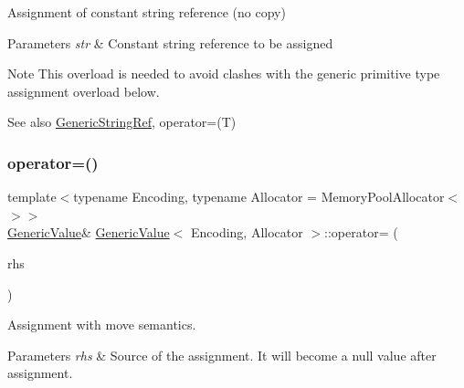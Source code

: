 Assignment of constant string reference (no copy) 


\begin{DoxyParams}{Parameters}
{\em str} & Constant string reference to be assigned \\
\hline
\end{DoxyParams}
\begin{DoxyNote}{Note}
This overload is needed to avoid clashes with the generic primitive type assignment overload below. 
\end{DoxyNote}
\begin{DoxySeeAlso}{See also}
\hyperlink{structGenericStringRef}{Generic\+String\+Ref}, operator=(\+T) 
\end{DoxySeeAlso}
\mbox{\label{classGenericValue_a9018a40d7c52efc00daf803c51d3236c}} 
\subsubsection{\texorpdfstring{operator=()}{operator=()}\hspace{0.1cm}{\footnotesize\ttfamily [3/4]}}
{\footnotesize\ttfamily template$<$typename Encoding, typename Allocator = Memory\+Pool\+Allocator$<$$>$$>$ \\
\hyperlink{classGenericValue}{Generic\+Value}\& \hyperlink{classGenericValue}{Generic\+Value}$<$ Encoding, Allocator $>$\+::operator= (\begin{DoxyParamCaption}\item[{\hyperlink{classGenericValue}{Generic\+Value}$<$ Encoding, Allocator $>$ \&}]{rhs }\end{DoxyParamCaption})\hspace{0.3cm}{\ttfamily [inline]}}



Assignment with move semantics. 


\begin{DoxyParams}{Parameters}
{\em rhs} & Source of the assignment. It will become a null value after assignment. \\
\hline
\end{DoxyParams}
\mbox{\label{classGenericValue_a386708557555e6389184de608af5e6a6}} 
